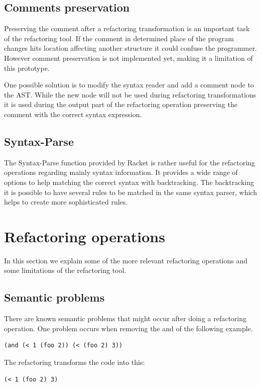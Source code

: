 \subsection{Comments preservation}
Preserving the comment after a refactoring transformation is an important task
of the refactoring tool. If the comment in determined place of the program
changes hits location affecting another structure it could confuse the programmer.
However comment preservation is not implemented yet, making it a limitation of
this prototype.

One possible solution is to modify the syntax reader and add a comment node to the
AST.
While the new node will not be used during refactoring transformations it is used
during the output part of the refactoring operation preserving the comment with
the correct syntax expression.


\subsection{Syntax-Parse}

The Syntax-Parse function provided by Racket is rather useful for the refactoring
operations regarding mainly syntax information.
It provides a wide range of options to help matching the correct syntax with  %
backtracking.
The backtracking it is possible to have several rules to be matched
in the same syntax parser, which helps to create more sophisticated rules.

\section{Refactoring operations}
In this section we explain some of the  more relevant refactoring operations and
some limitations of the refactoring tool.

\subsection{Semantic problems}
There are known semantic problems that might occur after doing a refactoring
operation.
One problem occurs when removing the and of the following example.

\begin{lstlisting}[basicstyle=\ttfamily, caption="And example"]
  (and (< 1 (foo 2)) (< (foo 2) 3))
\end{lstlisting}
The refactoring transforms the code into this:
\begin{lstlisting}[basicstyle=\ttfamily, caption="Example"]
  (< 1 (foo 2) 3)
\end{lstlisting}

